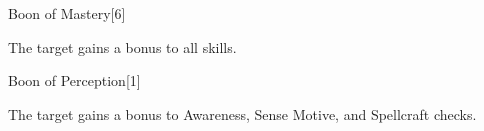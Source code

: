 \begin{spellsection}[Greater]{Boon of Mastery}[6]
    \begin{spellheader}
    \end{spellheader}
    \begin{spellcontent}
        \begin{spelltargetinginfo}
        \end{spelltargetinginfo}
        \begin{spelleffects}
            \spelleffect The target gains a  bonus to all skills.
            \spelldur \durshort
        \end{spelleffects}
    \end{spellcontent}
    \begin{spellfooter}
        \miscastrandom
    \end{spellfooter}
\end{spellsection}

\begin{spellsection}{Boon of Perception}[1]
    \begin{spellheader}
    \end{spellheader}
    \begin{spellcontent}
        \begin{spelltargetinginfo}
        \end{spelltargetinginfo}
        \begin{spelleffects}
            \spelleffect The target gains a  bonus to Awareness, Sense Motive, and Spellcraft checks.
            \spelldur \durshort
        \end{spelleffects}
    \end{spellcontent}
    \begin{spellfooter}
        \miscastrandom
    \end{spellfooter}
\end{spellsection}

